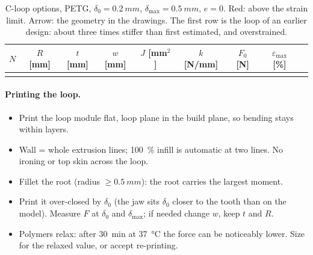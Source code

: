 \begin{table}[H]\centering\small
\caption{C-loop options, PETG, $\delta_0=\SI{0.2}{mm}$, $\delta_\text{max}=\SI{0.5}{mm}$, $e=0$.
Red: above the strain limit. Arrow: the geometry in the drawings. The first row is the loop of an
earlier design: about three times stiffer than first estimated, and overstrained.}\label{tab:loop}
\begin{tabular}{c S[table-format=1.1] S[table-format=1.1] S[table-format=1.1] S[table-format=2.1] S[table-format=2.1] S[table-format=1.1] S[table-format=1.2] c}
\toprule
{$N$} & {$R$ [mm]} & {$t$ [mm]} & {$w$ [mm]} & {$J$ [mm$^2$]} & {$k$ [N/mm]} & {$F_0$ [N]} & {$\varepsilon_\text{max}$ [\%]} & \\
\midrule
{}
\bottomrule
\end{tabular}
\end{table}

\paragraph{Printing the loop.}
\begin{itemize}
\item Print the loop module flat, loop plane in the build plane, so bending stays within layers.
\item Wall = whole extrusion lines; \SI{100}{\percent} infill is automatic at two lines. No
ironing or top skin across the loop.
\item Fillet the root (radius $\ge\SI{0.5}{mm}$): the root carries the largest moment.
\item Print it over-closed by $\delta_0$ (the jaw sits $\delta_0$ closer to the tooth than on the
model). Measure $F$ at $\delta_0$ and $\delta_\text{max}$; if needed change $w$, keep $t$ and $R$.
\item Polymers relax: after \SI{30}{min} at \SI{37}{\celsius} the force can be noticeably lower.
Size for the relaxed value, or accept re-printing.
\end{itemize}

